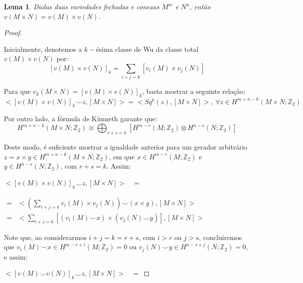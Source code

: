 \documentclass[12pt,oneside]{book} %
\newtheorem{lem}    {\hspace{0.5cm}Lema}[chapter]
\newcommand{\ds}{\displaystyle}
\newcommand{\Z}{\mathbb{Z}}
\newcommand{\ccup}{\smile}
\begin{document}
\begin{lem}
	Dadas duas variedades fechadas e conexas $M^{m}$ e $N^{n}$, então $v(M\times N)=v(M)\times v(N)$.
\end{lem}
\begin{proof}
	
	\
	
	\par Inicialmente, denotemos a $k-$ésima classe de Wu da classe total $v(M)\times v(N)$ por:
	$$ [v(M)\times v(N)]_{k}=\ds\sum_{i+j=k}\left[ v_{i}(M)\times v_{j}(N)\right] $$
	
	\par Para que $v_{k}(M\times N)=[v(M)\times v(N)]_{k}$, basta mostrar a seguinte relação:
	$$ <[v(M)\times v(N)]_{k}\ccup z,[M\times N]>=<Sq^{k}(z),[M\times N]>, \ \forall z\in H^{m+n-k}(M\times N;\Z_{2}) $$
	
	\par Por outro lado, a fórmula de Künneth garante que:
	$$ H^{m+n-k}(M\times N;\Z_{2})\cong \bigoplus_{r+s=k}\left[ H^{m-r}(M;\Z_{2})\otimes H^{n-s}(N;\Z_{2})\right] $$
	
	\par Deste modo, é suficiente mostrar a igualdade anterior para um gerador arbitrário $z=x\times y\in H^{m+n-k}(M\times N;\Z_{2})$, em que $x\in H^{m-r}(M;\Z_{2})$ e $y\in H^{n-s}(N;\Z_{2})$, com $r+s=k$. Assim: \newline 
	
	$<[v(M)\times v(N)]_{k}\ccup z,[M\times N]>$ \ $=$ \newline 
	
	$\begin{array}{rl}
		= & <\left( \ds\sum_{i+j=k}v_{i}(M)\times v_{j}(N) \right) \ccup (x\times y),[M\times N]> \\
		= & <\ds\sum_{i+j=k}\left[ (v_{i}(M)\ccup x)\times( v_{j}(N)\ccup y) \right],[M\times N]>
	\end{array}$ \newline 
	
	\par Note que, ao considerarmos $i+j=k=r+s$, com $i>r$ ou $j>s$, concluiremos que $v_{i}(M)\ccup x\in H^{m-r+i}(M;\Z_{2})=0$ ou $v_{j}(N)\ccup y\in H^{n-s+j}(N;\Z_{2})=0$, e assim: \newline 
	
	$<[v(M)\ccup v(N)]_{k}\ccup z,[M\times N]>$ \ $=$ \newline 
	

\end{proof}
\end{document}
